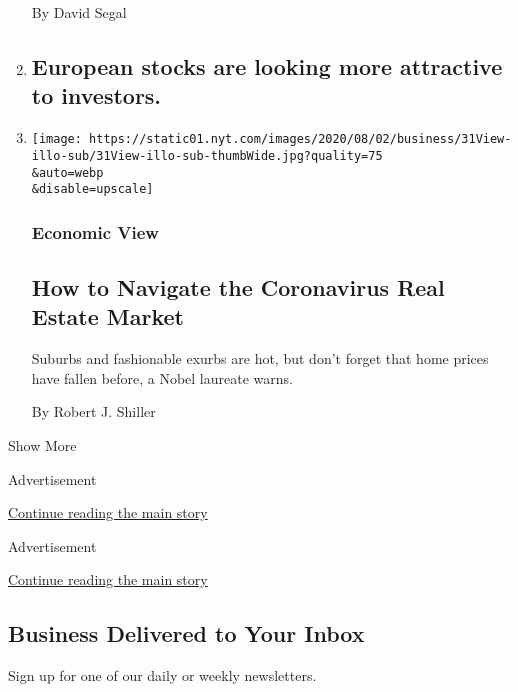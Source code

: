 \begin{enumerate}
  By David Segal
\item
  \href{/2020/07/31/business/european-stocks-are-looking-more-attractive-to-investors.html}{}

  \hypertarget{european-stocks-are-looking-more-attractive-to-investors}{%
  \subsection{European stocks are looking more attractive to
  investors.}\label{european-stocks-are-looking-more-attractive-to-investors}}
\item
  \href{/2020/07/31/business/housing-market-prices-risk.html}{}

  \texttt{[image: https://static01.nyt.com/images/2020/08/02/business/31View-illo-sub/31View-illo-sub-thumbWide.jpg?quality=75\\\&auto=webp\\\&disable=upscale]}

  \hypertarget{economic-view}{%
  \subsubsection{Economic View}\label{economic-view}}

  \hypertarget{how-to-navigate-the-coronavirus-real-estate-market}{%
  \subsection{How to Navigate the Coronavirus Real Estate
  Market}\label{how-to-navigate-the-coronavirus-real-estate-market}}

  Suburbs and fashionable exurbs are hot, but don't forget that home
  prices have fallen before, a Nobel laureate warns.

  By Robert J. Shiller
\end{enumerate}

Show More

Advertisement

\protect\hyperlink{after-mid2}{Continue reading the main story}

Advertisement

\protect\hyperlink{after-mktg}{Continue reading the main story}

\hypertarget{business-delivered-to-your-inbox}{%
\subsection{Business Delivered to Your
Inbox}\label{business-delivered-to-your-inbox}}

Sign up for one of our daily or weekly newsletters.

